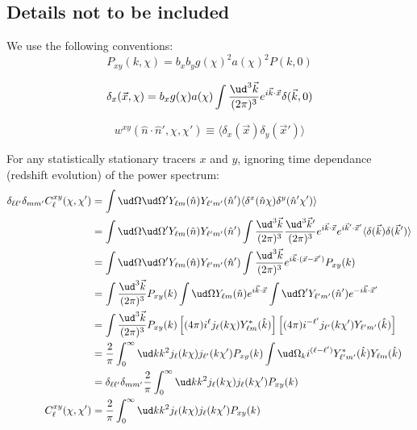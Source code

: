 

\begin{widetext}

\newpage

\section{Details not to be included}

We use the following conventions:
\begin{equation}
    P_{xy}(k, \chi) = b_x b_y g(\chi)^2 a(\chi)^2 P(k, 0)
\end{equation}

\begin{equation}
    \delta_x(\vec x, \chi) =  b_x g(\chi) a(\chi) \int\frac{\ud^3\vec k}{(2 \pi)^3}
        e^{i\vec k \cdot \vec x} \delta(\vec k, 0)
\end{equation}

\begin{equation}
    w^{xy}(\hat n \cdot \hat n', \chi, \chi')
    \equiv \langle \delta_x(\vec x) \delta_y(\vec x') \rangle
\end{equation}

For any statistically stationary tracers $x$ and $y$,
ignoring time dependance (redshift evolution)
of the power spectrum:
\begin{align}
    \delta_{\ell\ell'}\delta_{mm'}C^{xy}_\ell(\chi, \chi')
    &= \int\ud\Omega\ud\Omega'Y_{\ell m}(\hat n) Y_{\ell' m'}(\hat n')
        \langle \delta^x(\hat n \chi) \delta^y(\hat n' \chi') \rangle
        \\
    &=
        \int\ud\Omega\ud\Omega'Y_{\ell m}(\hat n) Y_{\ell' m'}(\hat n')
        \int\frac{\ud^3\vec k}{(2 \pi)^3} \frac{\ud^3\vec k'}{(2 \pi)^3}
        e^{i\vec k \cdot \vec x} e^{i\vec k' \cdot \vec x'}
        \langle \delta(\vec k) \delta(\vec k') \rangle
        \\
    &=
        \int\ud\Omega\ud\Omega'Y_{\ell m}(\hat n) Y_{\ell' m'}(\hat n')
        \int\frac{\ud^3\vec k}{(2 \pi)^3} 
        e^{i\vec k \cdot (\vec x - \vec x')} P_{xy}(k)
        \\
    &=
        \int\frac{\ud^3\vec k}{(2 \pi)^3} P_{xy}(k)
        \int\ud\Omega Y_{\ell m}(\hat n)
        e^{i\vec k \cdot \vec x}
        \int\ud\Omega' Y_{\ell' m'}(\hat n')
        e^{-i\vec k \cdot \vec x'}
        \\
    &=
        \int\frac{\ud^3\vec k}{(2 \pi)^3} P_{xy}(k)
        \left[(4 \pi) i^\ell j_\ell(k\chi) Y_{\ell m}^*(\hat k)\right]
        \left[(4 \pi) i^{-\ell'} j_{\ell'}(k\chi') Y_{\ell' m'}(\hat
        k)\right]
        \\
    &=
        \frac{2}{\pi}
        \int_0^\infty\ud k k^2 j_\ell(k\chi) j_{\ell'}(k\chi')P_{xy}(k)
        \int\ud \Omega_k i^{(\ell - \ell')}
        Y_{\ell' m'}^*(\hat k) Y_{\ell m}(\hat k)
        \\
    &= \delta_{\ell\ell'}\delta_{mm'}\frac{2}{\pi}
        \int_0^\infty\ud k k^2  j_\ell(k\chi) j_{\ell}(k\chi')P_{xy}(k)
        \\
    C^{xy}_\ell(\chi,\chi') 
    &= \frac{2}{\pi}
\int_0^\infty\ud k k^2 j_\ell(k\chi) j_{\ell}(k\chi')P_{xy}(k)
\end{align}


\end{widetext}
